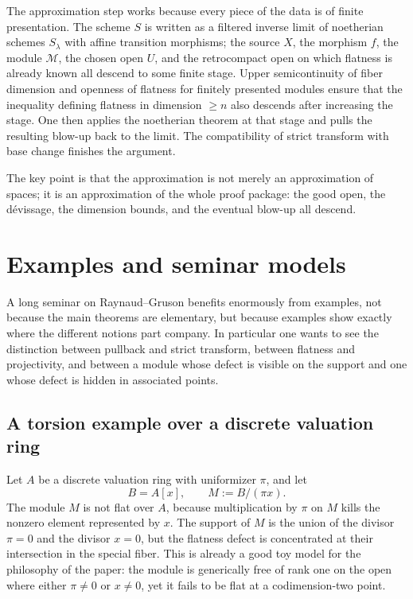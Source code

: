 \documentclass[11pt,oneside]{article}
\newcommand{\M}{\mathcal M}
\begin{document}
The approximation step works because every piece of the data is of finite presentation.  The scheme $S$ is written as a filtered inverse limit of noetherian schemes $S_\lambda$ with affine transition morphisms; the source $X$, the morphism $f$, the module $\M$, the chosen open $U$, and the retrocompact open on which flatness is already known all descend to some finite stage.  Upper semicontinuity of fiber dimension and openness of flatness for finitely presented modules ensure that the inequality defining flatness in dimension $\ge n$ also descends after increasing the stage.  One then applies the noetherian theorem at that stage and pulls the resulting blow-up back to the limit.  The compatibility of strict transform with base change finishes the argument.

The key point is that the approximation is not merely an approximation of spaces; it is an approximation of the whole proof package: the good open, the d\'evissage, the dimension bounds, and the eventual blow-up all descend.

\section{Examples and seminar models}

A long seminar on Raynaud--Gruson benefits enormously from examples, not because the main theorems are elementary, but because examples show exactly where the different notions part company.  In particular one wants to see the distinction between pullback and strict transform, between flatness and projectivity, and between a module whose defect is visible on the support and one whose defect is hidden in associated points.

\subsection{A torsion example over a discrete valuation ring}

Let $A$ be a discrete valuation ring with uniformizer $\pi$, and let
\[
B=A[x],\qquad M:=B/(\pi x).
\]
The module $M$ is not flat over $A$, because multiplication by $\pi$ on $M$ kills the nonzero element represented by $x$.  The support of $M$ is the union of the divisor $\pi=0$ and the divisor $x=0$, but the flatness defect is concentrated at their intersection in the special fiber.  This is already a good toy model for the philosophy of the paper: the module is generically free of rank one on the open where either $\pi\neq 0$ or $x\neq 0$, yet it fails to be flat at a codimension-two point.
\end{document}
